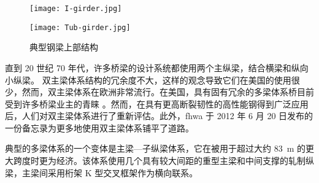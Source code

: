\begin{figure}
  \begin{minipage}{0.48\linewidth}\centering
    \texttt{[image: I-girder.jpg]}
  \end{minipage}\hfill
  \begin{minipage}{0.48\linewidth}\centering
    \texttt{[image: Tub-girder.jpg]}
  \end{minipage}
  \caption{典型钢梁上部结构}
  \label{fig:typical-steel-girder-superstructures}
\end{figure}

直到 20 世纪 70 年代，许多桥梁的设计系统都使用两个主纵梁，结合横梁和纵向小纵梁。 双主梁体系结构的冗余度不大，这样的观念导致它们在美国的使用很少，然而，双主梁体系在欧洲非常流行。在美国，具有固有冗余的多梁体系桥目前受到许多桥梁业主的青睐 \cite{nsba2008}。然而，在具有更高断裂韧性的高性能钢得到广泛应用后，人们对双主梁体系进行了重新评估。此外，\gls*{fhwa} 于 2012 年 6 月 20 日发布的一份备忘录为更多地使用双主梁体系铺平了道路\cite{fhwa2012a}。

典型的多梁体系的一个变体是主梁—子纵梁体系，它在被用于超过大约 \qty{83}{m} 的更大跨度时更为经济。该体系使用几个具有较大间距的重型主梁和中间支撑的轧制纵梁，主梁间采用桁架 K 型交叉框架作为横向联系。

